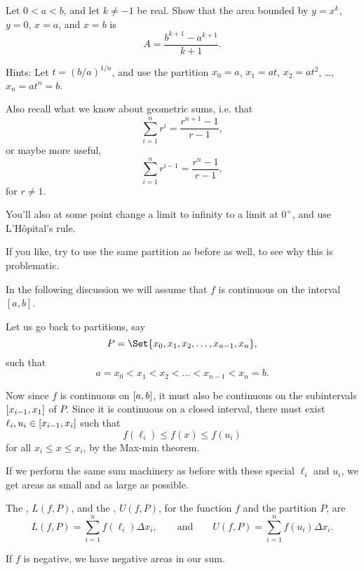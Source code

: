 \begin{exercise}
	Let $0 < a < b$, and let $k \neq -1$ be real.
	Show that the area bounded by $y = x^k$, $y = 0$, $x = a$, and $x = b$ is
	\[
		A = \frac{b^{k + 1} - a^{k + 1}}{k + 1}.
	\]

	\noindent
	Hints: Let $t = (b/a)^{1/n}$, and use the partition $x_0 = a$, $x_1 = a t$, $x_2 = a t^2$, \ldots, $x_n = a t^n = b$.

	Also recall what we know about geometric sums, i.e. that
	\[
		\sum_{i = 1}^n r^i = \frac{r^{n + 1} - 1}{r - 1},
	\]
	or maybe more useful,
	\[
		\sum_{i = 1}^n r^{i - 1} = \frac{r^n - 1}{r - 1},
	\]
	for $r \neq 1$.

	You'll also at some point change a limit to infinity to a limit at $0^+$, and use L'H\^{o}pital's rule.

	If you like, try to use the same partition as before as well, to see why this is problematic.
\end{exercise}


In the following discussion we will assume that $f$ is continuous on the interval $[a, b]$.

Let us go back to partitions, say
\[
	P = \Set{x_0, x_1, x_2, \ldots, x_{n - 1}, x_n},
\]
such that
\[
	a = x_0 < x_1 < x_2 < \ldots < x_{n - 1} < x_n = b.
\]

\noindent
Now since $f$ is continuous on $\interval{a}{b}$, it must also be continuous on the subintervals $\interval{x_{i-1}}{x_1}$ of $P$.
Since it is continuous on a closed interval, there must exist $\ell_i, u_i \in \interval{x_{i-1}}{x_i}$ such that
\[
	f(\ell_i) \leq f(x) \leq f(u_i)
\]
for all $x_i \leq x \leq x_i$, by the Max-min theorem.

If we perform the same sum machinery as before with these special $\ell_i$ and $u_i$, we get areas as small and as large as possible.

\begin{definition}
	The , $L(f, P)$, and the , $U(f, P)$, for the function $f$ and the partition $P$, are
	\[
		L(f, P) = \sum_{i = 1}^n f(\ell_i) \Delta x_i, \qquad \text{and} \qquad U(f, P) = \sum_{i = 1}^n f(u_i) \Delta x_i.
	\]
\end{definition}

\begin{remark}
	If $f$ is negative, we have negative areas in our sum.
\end{remark}

